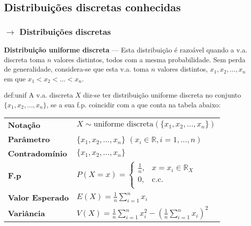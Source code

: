 \subsection[2.1 Distribuições discretas conhecidas]{\hspace*{0.075 em}\raisebox{0.2 em}{$\pmb{\drsh}$} Distribuições discretas conhecidas}

\subsubsection[2.2.3 Distribuições discretas]{$\pmb{\rightarrow}$ Distribuições discretas}

\noindent \textbf{Distribuição uniforme discreta} --- Esta distribuição é razoável quando a v.a. discreta toma $n$ valores distintos, todos com a mesma probabilidade. Sem perda de generalidade, considera-se que esta v.a. toma $n$ valores distintos, $x_1,x_2,\dots,x_n$ em que $x_1 < x_2 < \dots < x_n$.

\begin{theo}{def:unif}\label{def:unif-disc}
\noindent A v.a. discreta $X$ diz-se ter distribuição uniforme discreta no conjunto $\{x_1,x_2, \dots, x_n\}$, se a sua f.p. coincidir com a que conta na tabela abaixo:

\vspace{1 em}
\begin{center}
\begin{tabular}{p{4cm}p{8cm}}
\toprule
\textbf{Notação} & $X \sim \text{uniforme discreta}(\{x_1,x_2, \dots, x_n\})$\\
\addlinespace
\textbf{Parâmetro} & $\{x_1,x_2, \dots, x_n\}$ $(x_i \in \mathbb{R}, i = 1, \dots, n)$\\
\addlinespace
\textbf{Contradomínio} & $\{x_1,x_2, \dots, x_n\}$\\
\addlinespace
\textbf{F.p} & $P(X = x)= \left\{
                                \begin{array}{ll}
                                      \frac{1}{n}, & x = x_i \in \mathbb{R}_X\\
                                       0, & \text{c.c.}\\
                                \end{array} 
                          \right.$\\
\addlinespace
\textbf{Valor Esperado} & $E(X) = \frac{1}{n}\sum_{i = 1}^{n} x_i$\\
\addlinespace
\textbf{Variância} & $V(X) = \frac{1}{n}\sum_{i = 1}^{n} x_i^2 - (\frac{1}{n}\sum_{i = 1}^{n} x_i)^2$\\
\bottomrule
\end{tabular}
\end{center}

\vspace{0.5 em}
\end{theo}

